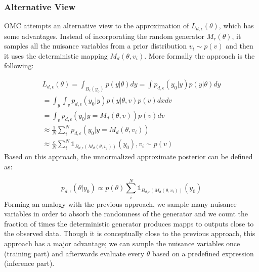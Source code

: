 \subsubsection*{Alternative View}

OMC attempts an alternative view to the approximation of $L_{d,\epsilon}(\theta)$, which has some advantages. Instead of incorporating the random generator $M_r(\theta)$, it samples all the nuisance variables from a prior distribution $v_i \sim p(v)$ and then it uses the deterministic mapping $M_d(\theta, v_i)$. More formally the approach is the following:

\begin{gather} 
  L_{d,\epsilon}(\theta)=\int_{B_\epsilon(y_0)}p(y|\theta)dy = \int p_{d,\epsilon}(y_0|y)p(y|\theta)dy\\
  = \int_y \int_v p_{d,\epsilon}(y_0|y)p(y|\theta, v) p(v)dxdv \\
  = \int_v p_{d,\epsilon}(y_0|y=M_d(\theta, v)) p(v)dv \\
  \approx \frac{1}{N} \sum_i^N p_{d,\epsilon} (y_0|y=M_d(\theta, v_i)) \\
  \approx \frac{c}{N} \sum_i^N \mathbb{1}_{B_{d,\epsilon}(M_d(\theta, v_i))} (y_0), v_i \sim p(v)
  \label{eq:alt_view}
\end{gather}
%
Based on this approach, the unnormalized approximate posterior can be defined as:

\begin{equation} \label{eq:posterior}
  p_{d,\epsilon}(\theta|y_0) \propto p(\theta) \sum_i^N \mathbb{1}_{B_{d,\epsilon}(M_d(\theta, v_i))} (y_0)
  \end{equation}
%
Forming an analogy with the previous approach, we sample many nuisance variables in order to absorb the randomness of the generator and we count the fraction of times the deterministic generator produces mapps to outputs close to the observed data. Though it is conceptually close to the previous approach, this approach has a major advantage; we can sample the nuisance variables once (training part) and afterwards evaluate every $\theta$ based on a predefined expression (inference part).
